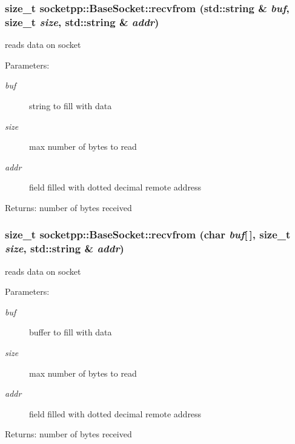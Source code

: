 \begin{CompactItemize}
{\subsubsection[{recvfrom}]{\setlength{\rightskip}{0pt plus 5cm}size\_\-t socketpp::BaseSocket::recvfrom (std::string \& {\em buf}, \/  size\_\-t {\em size}, \/  std::string \& {\em addr})}}
\label{classsocketpp_1_1BaseSocket_ace82407e13a6eee26aa1f5f642d0cfc}


reads data on socket 

\begin{Desc}
\item[Parameters:]
\begin{description}
\item[{\em buf}]string to fill with data \item[{\em size}]max number of bytes to read \item[{\em addr}]field filled with dotted decimal remote address \end{description}
\end{Desc}
\begin{Desc}
\item[Returns:]number of bytes received \end{Desc}
\hypertarget{classsocketpp_1_1BaseSocket_c7a79cd90b082806dcafb14fbbd130b8}{
\subsubsection[{recvfrom}]{\setlength{\rightskip}{0pt plus 5cm}size\_\-t socketpp::BaseSocket::recvfrom (char {\em buf}\mbox{[}$\,$\mbox{]}, \/  size\_\-t {\em size}, \/  std::string \& {\em addr})}}
\label{classsocketpp_1_1BaseSocket_c7a79cd90b082806dcafb14fbbd130b8}


reads data on socket 

\begin{Desc}
\item[Parameters:]
\begin{description}
\item[{\em buf}]buffer to fill with data \item[{\em size}]max number of bytes to read \item[{\em addr}]field filled with dotted decimal remote address \end{description}
\end{Desc}
\begin{Desc}
\item[Returns:]number of bytes received \end{Desc}
\hypertarget{classsocketpp_1_1BaseSocket_8224b8434da862a72b774a3c80006fcb}{
}
\end{CompactItemize}
